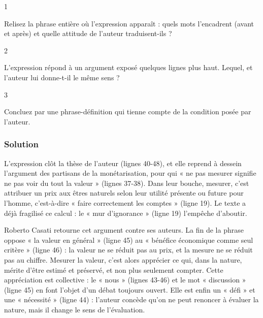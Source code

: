 \documentclass[11pt,a4paper]{article}
\begin{document}
\begin{indication}{1}

Relisez la phrase entière où l'expression apparaît : quels mots l'encadrent (avant et après) et quelle attitude de l'auteur traduisent-ils ?

\end{indication}

\begin{indication}{2}

L'expression répond à un argument exposé quelques lignes plus haut. Lequel, et l'auteur lui donne-t-il le même sens ?

\end{indication}

\begin{indication}{3}

Concluez par une phrase-définition qui tienne compte de la condition posée par l'auteur.

\end{indication}

\hypertarget{solution-2}{%
\subsubsection{Solution}\label{solution-2}}

L'expression clôt la thèse de l'auteur (lignes 40-48), et elle reprend à dessein l'argument des partisans de la monétarisation, pour qui « ne pas mesurer signifie ne pas voir du tout la valeur » (lignes 37-38). Dans leur bouche, mesurer, c'est attribuer un prix aux êtres naturels selon leur utilité présente ou future pour l'homme, c'est-à-dire « faire correctement les comptes » (ligne 19). Le texte a déjà fragilisé ce calcul : le « mur d'ignorance » (ligne 19) l'empêche d'aboutir.

Roberto Casati retourne cet argument contre ses auteurs. La fin de la phrase oppose « la valeur en général » (ligne 45) au « bénéfice économique comme seul critère » (ligne 46) : la valeur ne se réduit pas au prix, et la mesure ne se réduit pas au chiffre. Mesurer la valeur, c'est alors apprécier ce qui, dans la nature, mérite d'être estimé et préservé, et non plus seulement compter. Cette appréciation est collective : le « nous » (lignes 43-46) et le mot « discussion » (ligne 45) en font l'objet d'un débat toujours ouvert. Elle est enfin un « défi » et une « nécessité » (ligne 44) : l'auteur concède qu'on ne peut renoncer à évaluer la nature, mais il change le sens de l'évaluation.
\end{document}
